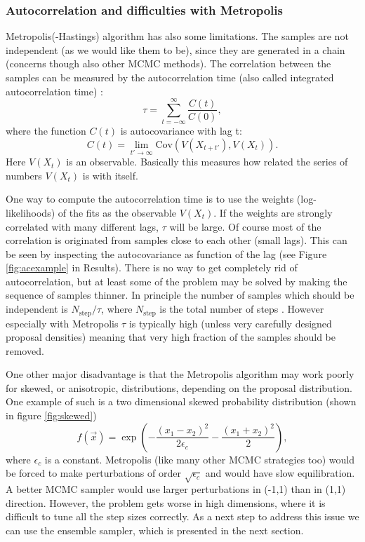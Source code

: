 \documentclass{wihuri}
\def\be{\begin{equation}}
\def\ee{\end{equation}}
\begin{document}
\subsubsection{Autocorrelation and difficulties with Metropolis}

Metropolis(-Hastings) algorithm has also some limitations. The samples are not independent (as we would like them to be), since they are generated in a chain (concerns though also other MCMC methods). The correlation between the samples can be measured by the autocorrelation time (also called integrated autocorrelation time) \cite{ensemble1}: 
\be \label{eq:autocorr_time}
\tau = \sum_{t=-\infty}^{\infty} \frac{C(t)}{C(0)} ,
\ee
where the function $C(t)$ is autocovariance with lag t:
\be \label{eq:autocovariance}
C(t) = \lim_{t'\to\infty}\mathrm{Cov}(V(X_{t+t'}),V(X_{t})).
\ee
Here $V(X_{t})$ is an observable. Basically this measures how related the series of numbers $V(X_{t})$ is with itself. 

One way to compute the autocorrelation time is to use the weights (log-likelihoods) of the fits as the observable $V(X_{t})$. If the weights are strongly correlated with many different lags, $\tau$ will be large. Of course most of the correlation is originated from samples close to each other (small lags). This can be seen by inspecting the autocovariance as function of the lag (see Figure \ref{fig:acexample} in Results). There is no way to get completely rid of autocorrelation, but at least some of the problem may be solved by making the sequence of samples thinner. In principle the number of samples which should be independent is $N_{\mathrm{step}}/\tau$, where $N_{\mathrm{step}}$ is the total number of steps \cite{kaiser}. However especially with Metropolis $\tau$ is typically high (unless very carefully designed proposal densities) meaning that very high fraction of the samples should be removed.

One other major disadvantage is that the Metropolis algorithm may work poorly for skewed, or anisotropic, distributions, depending on the proposal distribution. One example of such is a two dimensional skewed probability distribution (shown in figure \ref{fig:skewed})
\be \label{eq:skew} 
f(\vec{x}) = \exp(-\frac{(x_{1}-x_{2})^{2}}{2\epsilon_{c}}-\frac{(x_{1}+x_{2})^{2}}{2}),
\ee
where $\epsilon_{c}$ is a constant. Metropolis (like many other MCMC strategies too) would be forced to make perturbations of order $\sqrt{\epsilon_{c}}$ and would have slow equilibration. A better MCMC sampler would use larger perturbations in (-1,1) than in (1,1) direction. However, the problem gets worse in high dimensions, where it is difficult to tune all the step sizes correctly. As a next step to address this issue we can use the ensemble sampler, which is presented in the next section. 
\end{document}

